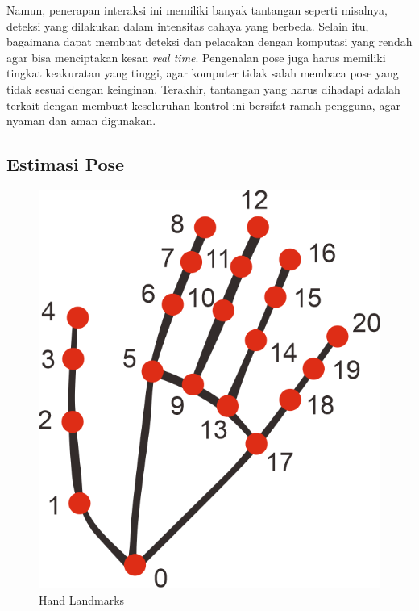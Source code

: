 Namun, penerapan interaksi ini memiliki banyak tantangan seperti misalnya, deteksi yang dilakukan dalam intensitas cahaya yang berbeda. Selain itu, bagaimana dapat membuat deteksi dan pelacakan dengan komputasi yang rendah agar bisa menciptakan kesan \emph{real time}. Pengenalan pose juga harus memiliki tingkat keakuratan yang tinggi, agar komputer tidak salah membaca pose yang tidak sesuai dengan keinginan. Terakhir, tantangan yang harus dihadapi adalah terkait dengan membuat keseluruhan kontrol ini bersifat ramah pengguna, agar nyaman dan aman digunakan.

\subsection{Estimasi Pose}

\begin{figure}[!htb] \centering
  \includegraphics[scale=1]{gambar/mediapipe_hand_landmark.png}
  \caption{Hand Landmarks}
  \label{fig:handlandmarks}
\end{figure}


